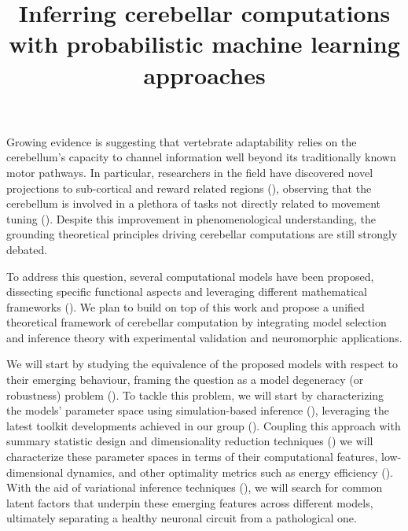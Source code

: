 \documentclass[a4paper, 10pt]{article}
\title{Inferring cerebellar computations with probabilistic machine learning
approaches}
\author{}
\begin{document}
\maketitle

Growing evidence is suggesting that vertebrate adaptability relies on the
cerebellum's capacity to channel information well beyond its traditionally known
motor pathways. In particular, researchers in the field have discovered novel
projections to sub-cortical and reward related regions (\cite{Washburn2024TheCD,
Ohmae2015ClimbingFE, Washburn2024TheCD, Wagner2017CerebellarGC}), observing that
the cerebellum is involved in a plethora of tasks not directly related to
movement tuning (\cite{Strick2009CerebellumAN, Overwalle2014SocialCA}). Despite
this improvement in phenomenological understanding, the grounding theoretical
principles driving cerebellar computations are still strongly debated.

To address this question, several computational models have been proposed,
dissecting specific functional aspects and leveraging different mathematical
frameworks (\cite{DeSchepper2021ModelSU, DAngelo2016ModelingTC,
Diedrichsen2019UniversalTO}). We plan to build on top of this work and propose a
unified theoretical framework of cerebellar computation by integrating model
selection and inference theory with experimental validation and neuromorphic
applications.

We will start by studying the equivalence of the proposed models with respect to
their emerging behaviour, framing the question as a model degeneracy (or
robustness) problem (\cite{Calaim2022TheGO, Gonalves2019TrainingDN}). To tackle
this problem, we will start by characterizing the models' parameter space using
simulation-based inference (\cite{Lueckmann2017FlexibleSI}), leveraging the
latest toolkit developments achieved in our group (\cite{TejeroCantero2020sbiAT,
Deistler2024DifferentiableSE}). Coupling this approach with summary statistic
design and dimensionality reduction techniques
(\cite{Pellegrino2024DimensionalityRB, Cenedese2022DatadrivenMA}) we will
characterize these parameter spaces in terms of their computational features,
low-dimensional dynamics, and other optimality metrics such as energy efficiency
(\cite{Jedlicka2022ParetoOE}). With the aid of variational inference techniques
(\cite{Bishop2012PatternRA, Luo2022UnderstandingDM}), we will search for common
latent factors that underpin these emerging features across different models,
ultimately separating a healthy neuronal circuit from a pathological one.
\end{document}
